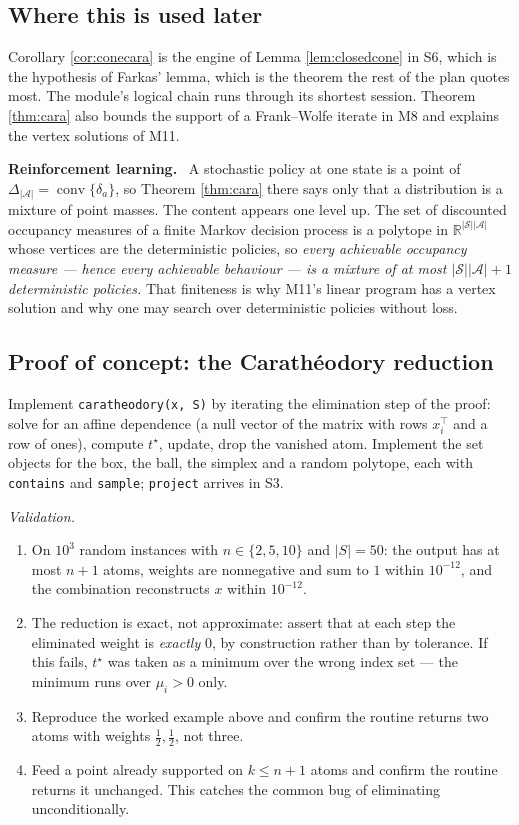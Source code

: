 \documentclass[11pt,a4paper]{article}
\newcommand{\mpart}[1]{\smallskip\noindent\textbf{#1}\ \ignorespaces}
\theoremstyle{definition}
\theoremstyle{plain}
\theoremstyle{remark}
\newcommand{\R}{\mathbb{R}}
\DeclareMathOperator{\conv}{conv}
\newcommand{\Simplex}{\Delta}
\begin{document}
\subsection*{Where this is used later}

Corollary \ref{cor:conecara} is the engine of Lemma \ref{lem:closedcone} in S6, which is the
hypothesis of Farkas' lemma, which is the theorem the rest of the plan quotes most. The
module's logical chain runs through its shortest session. Theorem \ref{thm:cara} also bounds
the support of a Frank--Wolfe iterate in M8 and explains the vertex solutions of M11.

\mpart{Reinforcement learning.} A stochastic policy at one state is a point of
$\Simplex_{|\mathcal A|}=\conv\{\delta_a\}$, so Theorem \ref{thm:cara} there says only that a
distribution is a mixture of point masses. The content appears one level up. The set of
discounted occupancy measures of a finite Markov decision process is a polytope in
$\R^{|\mathcal S||\mathcal A|}$ whose vertices are the deterministic policies, so \emph{every
achievable occupancy measure --- hence every achievable behaviour --- is a mixture of at most
$|\mathcal S||\mathcal A|+1$ deterministic policies.} That finiteness is why M11's linear
program has a vertex solution and why one may search over deterministic policies without loss.

\subsection*{Proof of concept: the Carath\'eodory reduction}

Implement \texttt{caratheodory(x, S)} by iterating the elimination step of the proof: solve for
an affine dependence (a null vector of the matrix with rows $x_i^\top$ and a row of ones),
compute $t^\star$, update, drop the vanished atom. Implement the set objects for the box, the
ball, the simplex and a random polytope, each with \texttt{contains} and \texttt{sample};
\texttt{project} arrives in S3.

\emph{Validation.}
\begin{enumerate}
\item On $10^3$ random instances with $n\in\{2,5,10\}$ and $|S|=50$: the output has at most
$n+1$ atoms, weights are nonnegative and sum to $1$ within $10^{-12}$, and the combination
reconstructs $x$ within $10^{-12}$.
\item The reduction is exact, not approximate: assert that at each step the eliminated weight
is \emph{exactly} $0$, by construction rather than by tolerance. If this fails, $t^\star$ was
taken as a minimum over the wrong index set --- the minimum runs over $\mu_i>0$ only.
\item Reproduce the worked example above and confirm the routine returns two atoms with weights
$\tfrac12,\tfrac12$, not three.
\item Feed a point already supported on $k\le n+1$ atoms and confirm the routine returns it
unchanged. This catches the common bug of eliminating unconditionally.
\end{enumerate}
\end{document}
